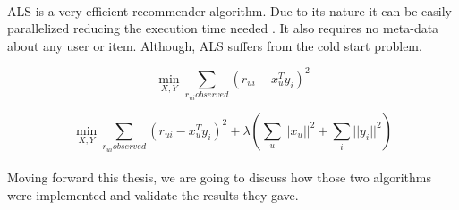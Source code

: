 \paragraph{} ALS is a very efficient recommender algorithm. Due to its nature it can be easily parallelized reducing the execution time needed \cite{DistributedAlgorithmsAndOptimization:4}. It also requires no meta-data about any user or item. Although, ALS suffers from the cold start problem.

\begin{equation}
	\min_{X,Y} \sum_{r_{ui}observed}(r_{ui}-x_{u}^{T}y_{i})^{2}
\end{equation}

\begin{equation}
	\min_{X,Y} \sum_{r_{ui}observed}(r_{ui}-x_{u}^{T}y_{i})^{2} + \lambda(\sum_{u}||x_{u}||^2 + \sum_{i}||y_{i}||^2)
\end{equation}

\paragraph{} Moving forward this thesis, we are going to discuss how those two algorithms were implemented and validate the results they gave.